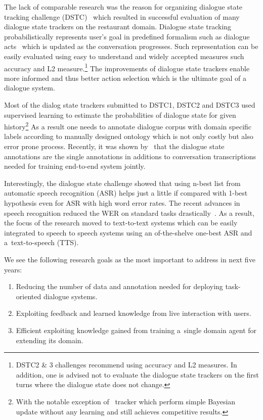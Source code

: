 \documentclass[11pt]{article}
\begin{document}
The lack of comparable research was the reason for organizing dialogue state tracking challenge (DSTC)~\cite{dsctwilliams} which resulted in successful evaluation of many dialogue state trackers on the restaurant domain.
Dialogue state tracking probabilistically represents user's goal in predefined formalism such as dialogue acts~\cite{dstcwilliams,hendersonsecond,hendersondthird} which is updated as the conversation progresses.
Such representation can be easily evaluated using easy to understand and widely accepted measures such accuracy and L2 measure.\footnote{DSTC2 & 3 challenges recommend using accuracy and L2 measures. In addition, one is advised not to evaluate the dialogue state trackers on the first turns where the dialogue state does not change.}
The improvements of dialogue state trackers enable more informed and thus better action selection which is the ultimate goal of a dialogue system.

Most of the dialog state trackers submitted to DSTC1, DSTC2 and DSTC3 used supervised learning to estimate the probabilities of dialogue state for given history\footnote{With the notable exception of~\citep{zilka} tracker which perform simple Bayesian update without any learning and still achieves competitive results.}
As a result one needs to annotate dialogue corpus with domain specific labels according to manually designed ontology which is not only costly but also error prone process.
Recently, it was shown by~\citep{wenend2end} that the dialogue state annotations are the single annotations in additions to conversation transcriptions needed for training end-to-end system jointly.

Interestingly, the dialogue state challenge showed that using n-best list from automatic speech recognition (ASR) helps just a little if compared with 1-best hypothesis even for ASR with high word error rates.
The recent advances in speech recognition reduced the WER on standard tasks drastically~\cite{new_povey,new_ms,new_google,new_vesely}.
As a result, the focus of the research moved to text-to-text systems which can be easily integrated to speech to speech systems using an of-the-shelve one-best ASR and a~text-to-speech (TTS).

We see the following research goals as the most important to address in next five years:
\begin{enumerate}
    \item Reducing the number of data and annotation needed for deploying task-oriented dialogue systems.
    \item Exploiting feedback and learned knowledge from live interaction with users.
    \item Efficient exploiting knowledge gained from training a~single domain agent for extending its domain. 
\end{enumerate}
\end{document}
